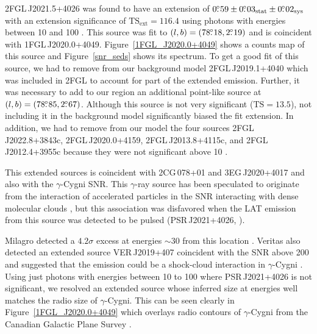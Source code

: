 \documentclass[12pt,preprint]{aastex}
\newcommand{\gev}{\text{GeV}\xspace}
\newcommand{\tev}{\text{TeV}\xspace}
\newcommand{\tsext}{{\ensuremath{\text{TS}_{\text{ext}}}}\xspace}
\newcommand{\ts}{\text{TS}\xspace}
\newcommand{\sys}{\text{sys}\xspace}
\newcommand{\stat}{\text{stat}\xspace}
\begin{document}
2FGL\,J2021.5+4026 was found to have an extension of
$0\fdg59\pm0\fdg03_\stat\pm0\fdg02_\sys$ with an extension significance
of $\tsext=116.4$ using 
 photons with energies between
10 \gev and 100 \gev.  This source
was fit to $(l,b)=(78\mbox{$.\!\!^\circ$}18,2\mbox{$.\!\!^\circ$}19)$ and is
coincident with 1FGL\,J2020.0+4049. 
Figure~\ref{1FGL_J2020.0+4049} shows a counts map of this source
and Figure~\ref{snr_seds} shows its spectrum.  
To get a good fit of this source, we had to remove from our background
model 2FGL\,J2019.1+4040 which was included in 2FGL to account for
part of the extended emission.
Further, it was necessary to add to our region an additional point-like source 
at
$(l,b)=(78\mbox{$.\!\!^\circ$}85,2\mbox{$.\!\!^\circ$}67)$.
Although this source is not very significant
($\ts=13.5$), not including it in the
background model significantly biased the fit extension.
In addition, we had to remove from our model the four 
sources 2FGL\,J2022.8+3843c, 2FGL\,J2020.0+4159, 2FGL\,J2013.8+4115c,
and 2FGL\,J2012.4+3955c because they were not significant
above 10 \gev.  

This extended sources is coincident with 2CG\,078+01 and
3EG\,J2020+4017 \citep{second_cos_b_catalog,third_egret_catalog}
and also with the $\gamma$-Cygni SNR. This $\gamma$-ray source has
been speculated to originate from the interaction of accelerated
particles in the SNR interacting with dense molecular clouds
\citep{pollock_1985,gaisser_1998},  but this association was disfavored
when the LAT \gev emission from this source was detected to be pulsed
(PSR\,J2021+4026, \cite{first_lat_pulsar_cat}).

Milagro detected a $4.2\sigma$ excess at energies $\sim 30$ \tev
from this location \citep{lat_bsl,milagro_bright_source_list}.
Veritas also detected an extended source VER\,J2019+407 coincident
with the SNR above 200 \gev and suggested that the \tev emission could be a
shock-cloud interaction in $\gamma$-Cygni \citep{veritas_gamma_cygni}.
Using just photons with energies between 10 \gev to 100 \gev 
where
PSR\,J2021+4026 is not significant, we resolved an extended source whose inferred size at
\gev energies well matches the radio size of $\gamma$-Cygni. This can
be seen clearly in Figure~\ref{1FGL_J2020.0+4049} which overlays radio
contours of $\gamma$-Cygni from the Canadian Galactic Plane Survey
\citep{canadian_galactic_plane_survey}.
\end{document}
